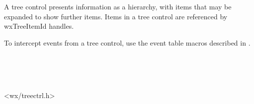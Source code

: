\section{}\label{wxtreectrl}

A tree control presents information as a hierarchy, with items that may be expanded
to show further items. Items in a tree control are referenced by wxTreeItemId handles.

To intercept events from a tree control, use the event table macros described in .


\\
\\
\\


<wx/treectrl.h>


